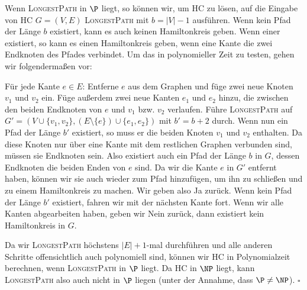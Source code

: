 Wenn \textsc{LongestPath} in $\P$ liegt, so können wir, um \textsc{HC} zu lösen,
auf die Eingabe von \textsc{HC} $G = (V, E)$ \textsc{LongestPath} mit
$b = |V| - 1$ ausführen. Wenn kein Pfad der Länge $b$ existiert, kann es auch
keinen Hamiltonkreis geben. Wenn einer existiert, so kann es einen Hamiltonkreis
geben, wenn eine Kante die zwei Endknoten des Pfades verbindet. Um das in
polynomieller Zeit zu testen, gehen wir folgendermaßen vor:

Für jede Kante $e \in E$: Entferne $e$ aus dem Graphen und füge zwei neue Knoten
$v_1$ und $v_2$ ein. Füge außerdem zwei neue Kanten $e_1$ und $e_2$ hinzu, die
zwischen den beiden Endknoten von $e$ und $v_1$ bzw. $v_2$ verlaufen. Führe
\textsc{LongestPath} auf $G' = (V \cup \{v_1, v_2\}, (E \setminus \{e\}) \cup \{e_1, e_2\})$
mit $b' = b + 2$ durch. Wenn nun ein Pfad der Länge $b'$ existiert, so muss er
die beiden Knoten $v_1$ und $v_2$ enthalten. Da diese Knoten nur über eine Kante
mit dem restlichen Graphen verbunden sind, müssen sie Endknoten sein. Also
existiert auch ein Pfad der Länge $b$ in $G$, dessen Endknoten die beiden Enden
von $e$ sind. Da wir die Kante $e$ in $G'$ entfernt haben, können wir sie auch
wieder zum Pfad hinzufügen, um ihn zu schließen und zu einem Hamiltonkreis zu
machen. Wir geben also Ja zurück. Wenn kein Pfad der Länge $b'$ existiert,
fahren wir mit der nächsten Kante fort. Wenn wir alle Kanten abgearbeiten haben,
geben wir Nein zurück, dann existiert kein Hamiltonkreis in $G$.

Da wir \textsc{LongestPath} höchstens $|E| + 1$-mal durchführen und alle anderen
Schritte offensichtlich auch polynomiell sind, können wir \textsc{HC} in
Polynomialzeit berechnen, wenn \textsc{LongestPath} in $\P$ liegt. Da \textsc{HC}
in $\NP$ liegt, kann \textsc{LongestPath} also auch nicht in $\P$ liegen (unter
der Annahme, dass $\P \neq \NP$). \hfill\(\square\)
